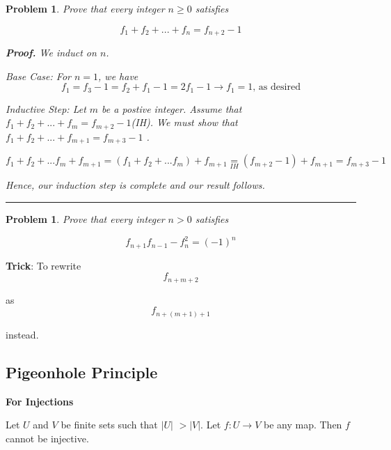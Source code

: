 \documentclass{article}
\newtheorem{problem}[theorem]{Problem}
\newenvironment{proof}[1][Proof]{\noindent\textbf{#1.} }{\ \rule{0.5em}{0.5em}}
\begin{document}
\begin{problem}
\bigskip Prove that every integer $n\geq 0$ satisfies

\begin{equation*}
f_{1}+f_{2}+...+f_{n}=f_{n+2}-1
\end{equation*}

\begin{proof}
We induct on $n$.

Base Case: For $n=1$, we have 
\begin{equation*}
f_{1}=f_{3}-1=f_{2}+f_{1}-1=2f_{1}-1\rightarrow f_{1}=1\text{, as desired}
\end{equation*}

Inductive Step: Let $m$ be a postive integer. Assume that $%
f_{1}+f_{2}+...+f_{m}=f_{m+2}-1$(IH). We must show that $%
f_{1}+f_{2}+...+f_{m+1}=f_{m+3}-1$ .

\begin{equation*}
f_{1}+f_{2}+...f_{m}+f_{m+1}=(f_{1}+f_{2}+...f_{m})+f_{m+1}\underset{IH}{=}%
(f_{m+2}-1)+f_{m+1}=f_{m+3}-1
\end{equation*}

Hence, our induction step is complete and our result follows.
\end{proof}
\end{problem}

\begin{problem}
Prove that every integer $n>0$ satisfies

\begin{equation*}
f_{n+1}f_{n-1}-f_{n}^{2}=(-1)^{n}
\end{equation*}
\end{problem}

\bigskip \textbf{Trick}: To rewrite%
\begin{equation*}
f_{n+m+2}
\end{equation*}

as 
\begin{equation*}
f_{n+(m+1)+1}
\end{equation*}

instead.

\bigskip 

\bigskip 

\subsection{Pigeonhole Principle}

\textbf{For Injections}

Let $U$ and $V$ be finite sets such that $|U|$ $>|V|$. Let  $f:U\rightarrow V
$ be any map. Then $f$ cannot be injective.
\end{document}
